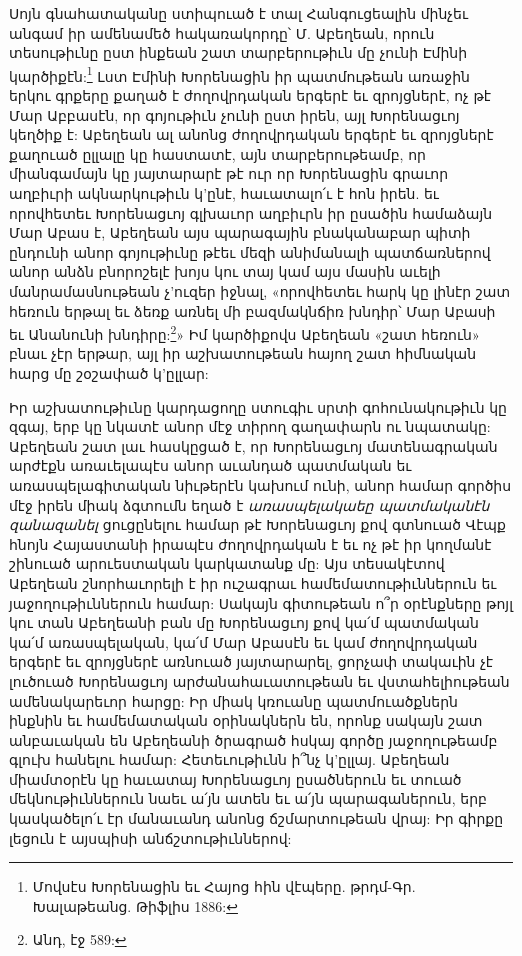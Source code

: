 \documentclass{article}
\begin{document}
{Սոյն գնահատականը ստիպուած է տալ Հանգուցեալին մինչեւ անգամ իր ամենամեծ հակառակորդը՝ Մ. Աբեղեան, որուն տեսութիւնը ըստ ինքեան շատ տարբերութիւն մը չունի Էմինի կարծիքէն:\footnote{Մովսէս Խորենացին եւ Հայոց հին վէպերը. թրդմ-Գր. Խալաթեանց. Թիֆլիս 1886:} Լստ Էմինի Խորենացին իր պատմութեան առաջին երկու գրքերը քաղած է ժողովրդական երգերէ եւ զրոյցներէ, ոչ թէ Մար Աբբասէն, որ գոյութիւն չունի ըստ իրեն, այլ Խորենացւոյ կեղծիք է: Աբեղեան ալ անոնց ժողովրդական երգերէ եւ զրոյցներէ քաղուած ըլլալը կը հաստատէ, այն տարբերութեամբ, որ միանգամայն կը յայտարարէ թէ ուր որ Խորենացին գրաւոր աղբիւրի ակնարկութիւն կ'ընէ, հաւատալո՛ւ է հոն իրեն. եւ որովհետեւ Խորենացւոյ գլխաւոր աղբիւրն իր ըսածին համաձայն Մար Աբաս է, Աբեղեան այս պարագային բնականաբար պիտի ընդունի անոր գոյութիւնը թէեւ մեզի անիմանալի պատճառներով անոր անձն բնորոշելէ խոյս կու տայ կամ այս մասին աւելի մանրամասնութեան չ'ուզեր իջնալ, «որովհետեւ հարկ կը լինէր շատ հեռուն երթալ եւ ձեռք առնել մի բազմակնճիռ խնդիր՝ Մար Աբասի եւ Անանունի խնդիրը:\footnote{Անդ, էջ 589:}» Իմ կարծիքովս Աբեղեան «շատ հեռուն» բնաւ չէր երթար, այլ իր աշխատութեան հայող շատ հիմնական հարց մը շօշափած կ'ըլլար:

Իր աշխատութիւնը կարդացողը ստուգիւ սրտի գոհունակութիւն կը զգայ, երբ կը նկատէ անոր մէջ տիրող գաղափարն ու նպատակը: Աբեղեան շատ լաւ հասկըցած է, որ Խորենացւոյ մատենագրական արժէքն առաւելապէս անոր աւանդած պատմական եւ առասպելագիտական նիւթերէն կախում ունի, անոր համար գործիս մէջ իրեն միակ ձգտումն եղած է \emph{առասպելակաեը պատմականէն զանազանել} ցուցընելու համար թէ Խորենացւոյ քով գտնուած Վէպք հնոյն Հայաստանի իրապէս ժողովրդական է եւ ոչ թէ իր կողմանէ շինուած արուեստական կարկատանք մը: Այս տեսակէտով Աբեղեան շնորհաւորելի է իր ուշագրաւ համեմատութիւններուն եւ յաջողութիւններուն համար: Սակայն գիտութեան ո՞ր օրէնքները թոյլ կու տան Աբեղեանի բան մը Խորենացւոյ քով կա՛մ պատմական կա՛մ առասպելական, կա՛մ Մար Աբասէն եւ կամ ժողովրդական երգերէ եւ զրոյցներէ առնուած յայտարարել, ցորչափ տակաւին չէ լուծուած Խորենացւոյ արժանահաւատութեան եւ վստահելիութեան ամենակարեւոր հարցը: Իր միակ կռուանը պատմուածքներն ինքնին եւ համեմատական օրինակներն են, որոնք սակայն շատ անբաւական են Աբեղեանի ծրագրած հսկայ գործը յաջողութեամբ գլուխ հանելու համար: Հետեւութիւնն ի՞նչ կ'ըլլայ. Աբեղեան միամտօրէն կը հաւատայ Խորենացւոյ ըսածներուն եւ տուած մեկնութիւններուն նաեւ ա՛յն ատեն եւ ա՛յն պարագաներուն, երբ կասկածելո՛ւ էր մանաւանդ անոնց ճշմարտութեան վրայ: Իր գիրքը լեցուն է այսպիսի անճշտութիւններով:

}
\end{document}
